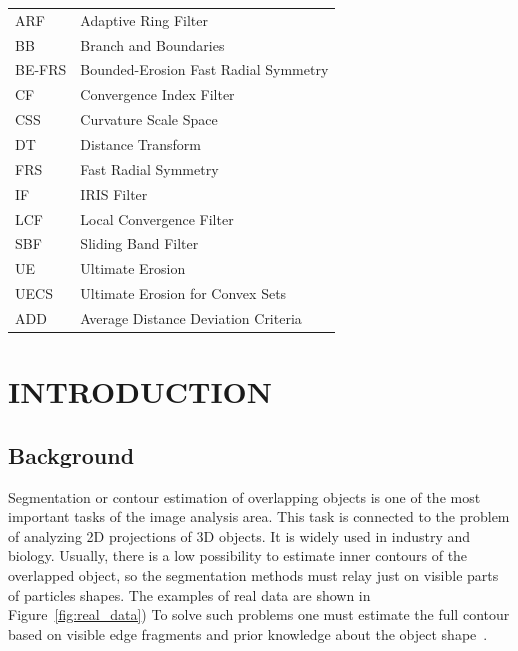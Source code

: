 \documentclass{lutmscthesis}[2010/09/22]
\begin{document}
\begin{tabular}{l l}
ARF & Adaptive Ring Filter\\
BB & Branch and Boundaries\\
BE-FRS & Bounded-Erosion Fast Radial Symmetry\\
CF & Convergence Index Filter\\
CSS & Curvature Scale Space \\
DT & Distance Transform \\
FRS & Fast Radial Symmetry \\
IF & IRIS Filter\\
LCF & Local Convergence Filter\\
SBF & Sliding Band Filter\\
UE & Ultimate Erosion\\
UECS & Ultimate Erosion for Convex Sets\\
ADD &  Average Distance Deviation Criteria
\end{tabular}



\setlength{\parskip}{3ex}



\section{INTRODUCTION}
\label{sec:introduction}

\subsection{Background}
\label{sec:background}

Segmentation or contour estimation of overlapping objects is one of the most important tasks of the image analysis area. This task is connected to the problem of analyzing 2D projections of 3D objects. It is widely used in industry and biology. Usually, there is a low possibility to estimate inner contours of the overlapped object, so the segmentation methods must relay just on visible parts of particles shapes. The examples of real data are shown in Figure~\ref{fig:real_data}) To solve such problems one must estimate the full contour based on visible edge fragments and prior knowledge about the object shape~\cite{zafari-thesis}.
\end{document}
